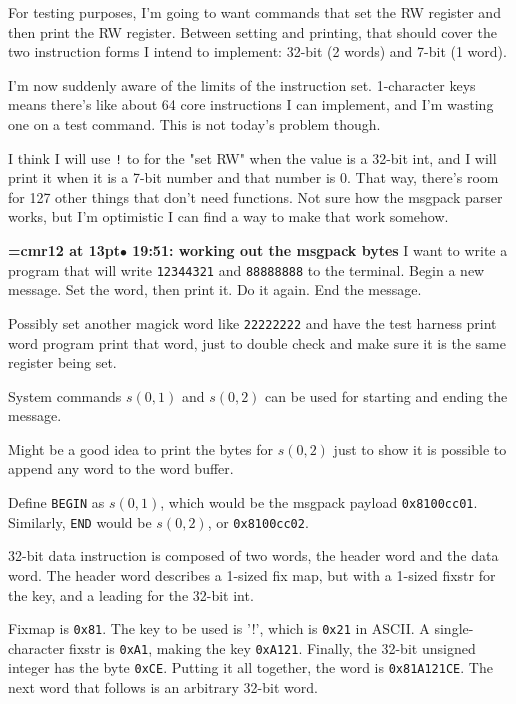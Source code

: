 For testing purposes, I'm going to want commands that set the RW register and then print the RW register. Between setting and printing, that should cover the two instruction forms I intend to implement: 32-bit (2 words) and 7-bit (1 word).
\par

I'm now suddenly aware of the limits of the instruction set. 1-character keys means there's like about 64 core instructions I can implement, and I'm wasting one on a test command. This is not today's problem though.
\par

I think I will use {\tt !} to for the "set RW" when the value is a 32-bit int, and I will print it when it is a 7-bit number and that number is 0. That way, there's room for 127 other things that don't need functions. Not sure how the msgpack parser works, but I'm optimistic I can find a way to make that work somehow.
\par

{\smallskip\noindent\bf\font\titlefont=cmr12 at 13pt\titlefont $\bullet$ 19:51: working out the msgpack bytes}\smallskip
I want to write a program that will write {\tt 12344321} and {\tt 88888888} to the terminal. Begin a new message. Set the word, then print it. Do it again. End the message.
\par

Possibly set another magick word like {\tt 22222222} and have the test harness print word program print that word, just to double check and make sure it is the same register being set.
\par

System commands $s(0, 1)$ and $s(0, 2)$ can be used for starting and ending the message.
\par

Might be a good idea to print the bytes for $s(0, 2)$ just to show it is possible to append any word to the word buffer.
\par

Define {\tt BEGIN} as $s(0,1)$, which would be the msgpack payload {\tt 0x8100cc01}. Similarly, {\tt END} would be $s(0,2)$, or {\tt 0x8100cc02}.
\par

32-bit data instruction is composed of two words, the header word and the data word. The header word describes a 1-sized fix map, but with a 1-sized fixstr for the key, and a leading for the 32-bit int.
\par

Fixmap is {\tt 0x81}. The key to be used is '!', which is {\tt 0x21} in ASCII. A single-character fixstr is {\tt 0xA1}, making the key {\tt 0xA121}. Finally, the 32-bit unsigned integer has the byte {\tt 0xCE}. Putting it all together, the word is {\tt 0x81A121CE}. The next word that follows is an arbitrary 32-bit word.
\par


